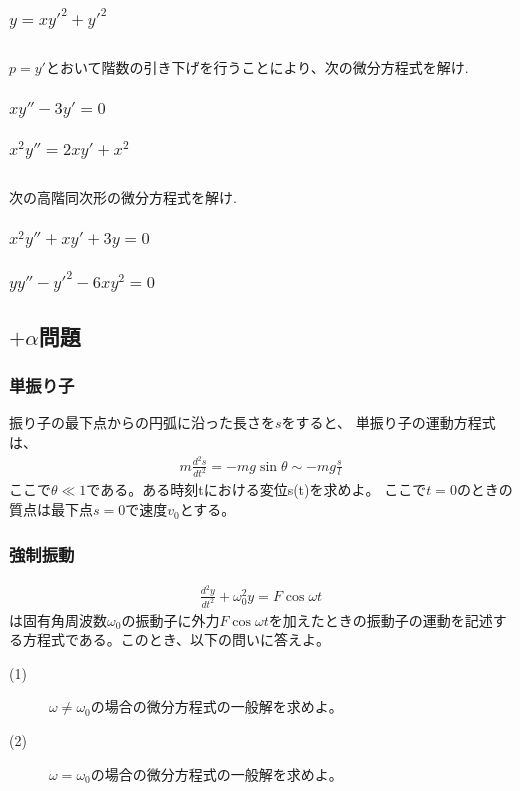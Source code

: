 \documentclass[a4paper,11pt,fleqn]{jarticle}
\begin{document}
\subsubsection{$y=x{y'}^2+{y'}^2$}

\newpage
\subsection{}
$p=y'$とおいて階数の引き下げを行うことにより、次の微分方程式を解け.
\subsubsection{$xy''-3y'=0$}

\vspace{90mm}
\subsubsection{$x^2y''=2xy'+x^2$}

\newpage
\subsection{}
次の高階同次形の微分方程式を解け.
\subsubsection{$x^2y''+xy'+3y=0$}

\vspace{90mm}
\subsubsection{$yy''-{y'}^2-6xy^2=0$}

\newpage
\subsection{$+\alpha$問題}
\subsubsection{単振り子}
振り子の最下点からの円弧に沿った長さを$s$をすると、
単振り子の運動方程式は、
\begin{eqnarray*}
m\frac{d^2s}{dt^2}=-mg\sin\theta\sim-mg\frac{s}{l}
\end{eqnarray*}
ここで$\theta\ll1$である。ある時刻tにおける変位s(t)を求めよ。
ここで$t=0$のときの質点は最下点$s=0$で速度$v_0$とする。

\newpage
\subsubsection{強制振動}
\begin{eqnarray*}
\frac{d^2y}{dt^2}+\omega_0^2y=F\cos{\omega{t}}
\end{eqnarray*}
は固有角周波数$\omega_0$の振動子に外力$F\cos{\omega{t}}$を加えたときの振動子の運動を記述する方程式である。このとき、以下の問いに答えよ。
\begin{description}
\item[(1)]$\omega\neq\omega_0$の場合の微分方程式の一般解を求めよ。
\item[(2)]$\omega=\omega_0$の場合の微分方程式の一般解を求めよ。
\end{description}
\end{document}

